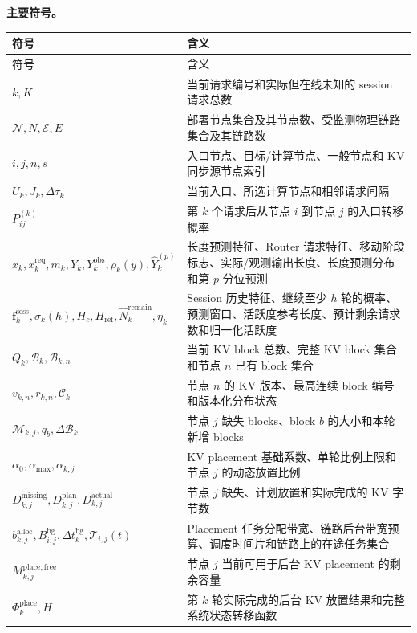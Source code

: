 \textbf{主要符号。}
\begingroup
\small
\setlength{\LTpre}{4pt}
\setlength{\LTpost}{6pt}
\begin{longtable}{p{}p{}}
\toprule
符号 & 含义 \\
\midrule
\endfirsthead
\toprule
符号 & 含义 \\
\midrule
\endhead
\(k,K\) & 当前请求编号和实际但在线未知的 session 请求总数 \\
\(\mathcal N,N,\mathcal E,E\) & 部署节点集合及其节点数、受监测物理链路集合及其链路数 \\
\(i,j,n,s\) & 入口节点、目标/计算节点、一般节点和 KV 同步源节点索引 \\
\(U_k,J_k,\Delta\tau_k\) & 当前入口、所选计算节点和相邻请求间隔 \\
\(P_{ij}^{(k)}\) & 第 \(k\) 个请求后从节点 \(i\) 到节点 \(j\) 的入口转移概率 \\
\(x_k,x_k^{\mathrm{req}},m_k,Y_k,Y_k^{\mathrm{obs}},\rho_k(y),\widehat Y_k^{(p)}\) & 长度预测特征、Router 请求特征、移动阶段标志、实际/观测输出长度、长度预测分布和第 \(p\) 分位预测 \\
\(\mathbf f_k^{\mathrm{sess}},\sigma_k(h),H_c,H_{\mathrm{ref}},\widehat N_k^{\mathrm{remain}},\eta_k\) & Session 历史特征、继续至少 \(h\) 轮的概率、预测窗口、活跃度参考长度、预计剩余请求数和归一化活跃度 \\
\(Q_k,\mathcal B_k,\mathcal B_{k,n}\) & 当前 KV block 总数、完整 KV block 集合和节点 \(n\) 已有 block 集合 \\
\(v_{k,n},r_{k,n},\mathcal C_k\) & 节点 \(n\) 的 KV 版本、最高连续 block 编号和版本化分布状态 \\
\(\mathcal M_{k,j},q_b,\Delta\mathcal B_k\) & 节点 \(j\) 缺失 blocks、block \(b\) 的大小和本轮新增 blocks \\
\(\alpha_0,\alpha_{\max},\alpha_{k,j}\) & KV placement 基础系数、单轮比例上限和节点 \(j\) 的动态放置比例 \\
\(D_{k,j}^{\mathrm{missing}},D_{k,j}^{\mathrm{plan}},D_{k,j}^{\mathrm{actual}}\) & 节点 \(j\) 缺失、计划放置和实际完成的 KV 字节数 \\
\(b_{k,j}^{\mathrm{alloc}},B_{i,j}^{\mathrm{bg}},\Delta t_k^{\mathrm{bg}},\mathcal T_{i,j}(t)\) & Placement 任务分配带宽、链路后台带宽预算、调度时间片和链路上的在途任务集合 \\
\(M_{k,j}^{\mathrm{place,free}}\) & 节点 \(j\) 当前可用于后台 KV placement 的剩余容量 \\
\(\Phi_k^{\mathrm{place}},H\) & 第 \(k\) 轮实际完成的后台 KV 放置结果和完整系统状态转移函数 \\

\end{longtable}
